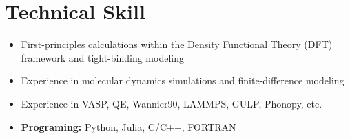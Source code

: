 \hypertarget{technical-skill}{%
\section{Technical Skill}\label{technical-skill}}

\begin{itemize}
\tightlist
\item
  First-principles calculations within the Density Functional Theory
  (DFT) framework and tight-binding modeling
\item
  Experience in molecular dynamics simulations and finite-difference
  modeling
\item
  Experience in VASP, QE, Wannier90, LAMMPS, GULP, Phonopy, etc.
\item
  \textbf{Programing:} Python, Julia, C/C++, FORTRAN
\end{itemize}
